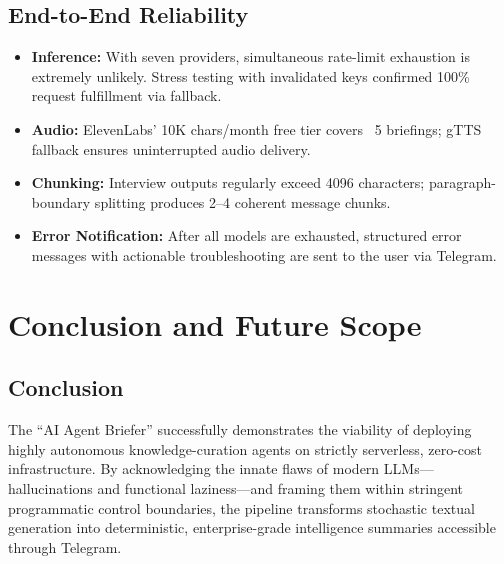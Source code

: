 \documentclass[12pt,a4paper]{report}
\begin{document}
\section{End-to-End Reliability}
\begin{itemize}
    \item \textbf{Inference:} With seven providers, simultaneous rate-limit exhaustion is extremely unlikely. Stress testing with invalidated keys confirmed 100\% request fulfillment via fallback.
    \item \textbf{Audio:} ElevenLabs' 10K chars/month free tier covers ~5 briefings; gTTS fallback ensures uninterrupted audio delivery.
    \item \textbf{Chunking:} Interview outputs regularly exceed 4096 characters; paragraph-boundary splitting produces 2--4 coherent message chunks.
    \item \textbf{Error Notification:} After all models are exhausted, structured error messages with actionable troubleshooting are sent to the user via Telegram.
\end{itemize}

\chapter{Conclusion and Future Scope}

\section{Conclusion}
The ``AI Agent Briefer'' successfully demonstrates the viability of deploying highly autonomous knowledge-curation agents on strictly serverless, zero-cost infrastructure. By acknowledging the innate flaws of modern LLMs---hallucinations and functional laziness---and framing them within stringent programmatic control boundaries, the pipeline transforms stochastic textual generation into deterministic, enterprise-grade intelligence summaries accessible through Telegram.
\end{document}
